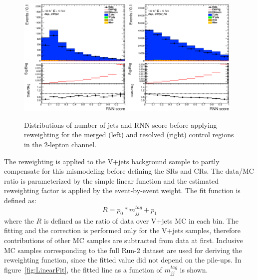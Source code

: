 \begin{figure}[ht]
    \includegraphics[width=0.48\textwidth]{figures/2lep/reweighting/before_reweighting/C_0ptag1pfat0pjet_0ptv_CRVjet_RNNScoreMerged_Lin.eps}
    \includegraphics[width=0.48\textwidth]{figures/2lep/reweighting/before_reweighting/C_0ptag2pjet_0ptv_CRVjet_Fid_RNNScoreResolved_Lin.eps}
    \caption{ Distributions of number of jets and RNN score before applying reweighting for the merged (left) and resolved (right) control regions in the 2-lepton channel.}
    \label{fig:before_rw}
\end{figure}

The reweighting is applied to the V+jets background sample to partly compensate for this mismodeling before defining the SRs and CRs. 
The data/MC ratio is parameterized by the simple linear function and the estimated reweighting factor is applied by the event-by-event weight. 
The fit function is defined as:
\begin{equation}
\label{eqn:reweight}
R=p_{0} * m_{jj}^{tag}+p_{1}
\end{equation}
where the $R$ is defined as the ratio of data over V+jets MC in each bin.
The fitting and the correction is performed only for the V+jets samples, therefore contributions of other MC samples are subtracted from data at first. 
Inclusive MC samples corresponding to the full Run-2 dataset are used for deriving the reweighting function, since the fitted value did not depend on the pile-ups.
In figure~\ref{fig:LinearFit}, the fitted line as a function of $m^{tag}_{jj}$ is shown. 

